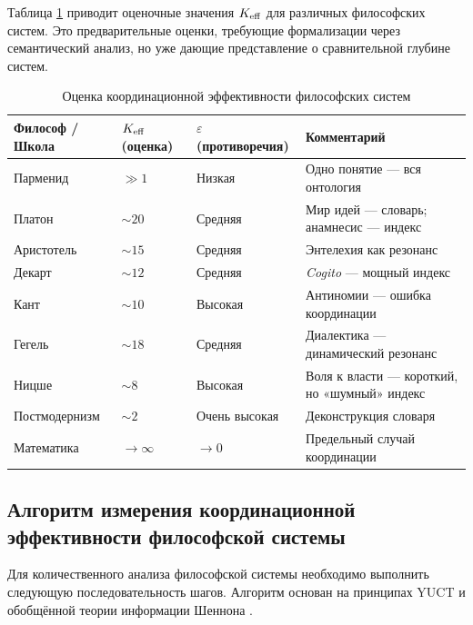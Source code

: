 \documentclass[12pt,a4paper]{article}
\newcommand{\eps}{\varepsilon}
\begin{document}
	Таблица \ref{tab:keff-examples} приводит оценочные значения \(\Keff\) для различных философских систем. Это предварительные оценки, требующие формализации через семантический анализ, но уже дающие представление о сравнительной глубине систем.
	
	\begin{table}[H]
		\centering
		\caption{Оценка координационной эффективности философских систем}
		\label{tab:keff-examples}
		\begin{tabular}{p{3.5cm}p{3.5cm}p{3.5cm}p{3.5cm}}
			\toprule
			\textbf{Философ / Школа} & \(\Keff\) (оценка) & \(\eps\) (противоречия) & \textbf{Комментарий} \\
			\midrule
			Парменид & \(\gg 1\) & Низкая & Одно понятие — вся онтология \\
			Платон & \(\sim 20\) & Средняя & Мир идей — словарь; анамнесис — индекс \\
			Аристотель & \(\sim 15\) & Средняя & Энтелехия как резонанс \\
			Декарт & \(\sim 12\) & Средняя & \textit{Cogito} — мощный индекс \\
			Кант & \(\sim 10\) & Высокая & Антиномии — ошибка координации \\
			Гегель & \(\sim 18\) & Средняя & Диалектика — динамический резонанс \\
			Ницше & \(\sim 8\) & Высокая & Воля к власти — короткий, но «шумный» индекс \\
			Постмодернизм & \(\sim 2\) & Очень высокая & Деконструкция словаря \\
			Математика & \(\to \infty\) & \(\to 0\) & Предельный случай координации \\
			\bottomrule
		\end{tabular}
	\end{table}
	
	\subsection{Алгоритм измерения координационной эффективности философской системы}
	\label{subsec:measurement-algorithm}
	
	Для количественного анализа философской системы необходимо выполнить следующую последовательность шагов. Алгоритм основан на принципах YUCT и обобщённой теории информации Шеннона \cite{AppendixX}.
	
\end{document}
